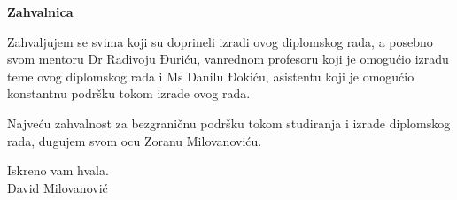 \documentclass[a4paper, 12pt, diplomski]{etf}
\begin{document}
\thispagestyle{empty}

\newpage

\tableofcontents

\begingroup
\let\clearpage\relax
\listoffigures
\endgroup

\newpage




\newpage

\begin{center}
\vspace*{\fill}

	\begin{Large}
		\textbf{Zahvalnica}
	\end{Large}
	
	Zahvaljujem se svima koji su doprineli izradi ovog diplomskog rada, a posebno svom mentoru Dr Radivoju Đuriću, vanrednom profesoru koji je omogućio izradu teme ovog diplomskog rada i Ms Danilu Đokiću, asistentu koji je omogućio konstantnu podršku tokom izrade ovog rada.
	
	Najveću zahvalnost za bezgraničnu podršku tokom studiranja i izrade diplomskog rada, dugujem svom ocu Zoranu Milovanoviću.
	
	\hfill Iskreno vam hvala.\\
	\hfill David Milovanović
		
\vspace*{\fill}	
\end{center}
\end{document}

